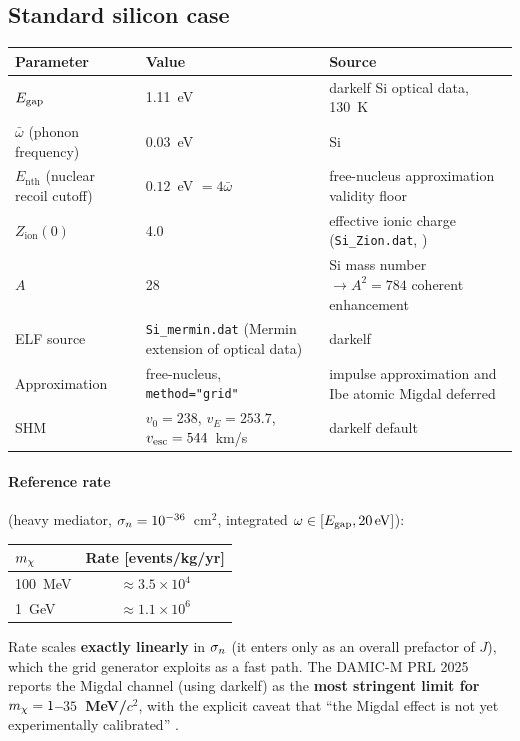 \subsection{Standard silicon case}

\begin{center}
\begin{tabular}{@{}p{4.3cm}p{4cm}p{5.5cm}@{}}
\toprule
Parameter & Value & Source \\
\midrule
$E_\mathrm{gap}$ & 1.11~eV & darkelf Si optical data, 130~K \\
$\bar\omega$ (phonon frequency) & 0.03~eV & Si \\
$E_\mathrm{nth}$ (nuclear recoil cutoff) & $0.12$~eV $=4\bar\omega$ &
  free-nucleus approximation validity floor \\
$Z_\mathrm{ion}(0)$ & 4.0 & effective ionic charge (\texttt{Si\_Zion.dat},
  \citealt{Brown2006}) \\
$A$ & 28 & Si mass number $\to A^2=784$ coherent enhancement \\
ELF source & \texttt{Si\_mermin.dat} (Mermin extension of optical data) &
  darkelf \\
Approximation & free-nucleus, \texttt{method="grid"} & impulse
  approximation and Ibe atomic Migdal deferred \\
SHM & $v_0=238$, $v_E=253.7$, $v_\mathrm{esc}=544$~km/s & darkelf default \\
\bottomrule
\end{tabular}
\end{center}

\paragraph{Reference rate} (heavy mediator, $\sigma_n=10^{-36}$~cm$^2$,
integrated $\omega\in[E_\mathrm{gap},20\,\mathrm{eV}]$):

\begin{center}
\begin{tabular}{@{}lc@{}}
\toprule
$m_\chi$ & Rate [events/kg/yr] \\
\midrule
100~MeV & $\approx3.5\times10^4$ \\
1~GeV & $\approx1.1\times10^6$ \\
\bottomrule
\end{tabular}
\end{center}

Rate scales \textbf{exactly linearly} in $\sigma_n$ (it enters only as an
overall prefactor of $J$), which the grid generator exploits as a fast path.
The DAMIC-M PRL 2025 reports the Migdal channel (using darkelf) as the
\textbf{most stringent limit for $m_\chi=1$--$35$~MeV/$c^2$}, with the
explicit caveat that ``the Migdal effect is not yet experimentally
calibrated'' \citep{DAMICM2025}.

